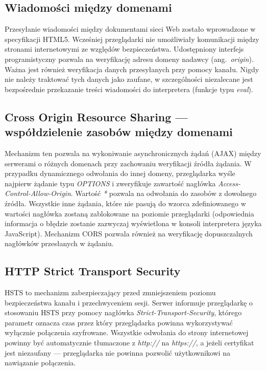 \documentclass[11pt,a4paper,polish,thesis]{dcsbook}
\begin{document}
\subsection{Wiadomości między domenami}
Przesyłanie wiadomości między dokumentami sieci Web zostało wprowadzone w specyfikacji HTML5. Wcześniej przeglądarki nie umożliwiały komunikacji między stronami internetowymi ze względów bezpieczeństwa. Udostępniony interfejs programistyczny pozwala na weryfikację adresu domeny nadawcy (ang.~\textit{origin}). Ważna jest również weryfikacja danych przesyłanych przy pomocy kanału. Nigdy nie należy traktować tych danych jako zaufane, w szczególności niezalecane jest bezpośrednie przekazanie treści wiadomości do interpretera (funkcje typu \textit{eval}).

\subsection{Cross Origin Resource Sharing --- współdzielenie zasobów między domenami}
Mechanizm ten pozwala na wykoniwanie asynchronicznych żądań (AJAX) między serwerami o różnych domenach przy zachowaniu weryfikacji źródła żądania. W przypadku dynamicznego odwołania do innej domeny, przeglądarka wyśle najpierw żądanie typu \textit{OPTIONS} i zweryfikuje zawartość nagłówka \textit{Access-Control-Allow-Origin}. Wartość \textit{*} pozwala na odwołania do zasobów z dowolnego źródła. Wszystkie inne żądania, które nie pasują do wzorca zdefiniowanego w wartości nagłówka zostaną zablokowane na poziomie przeglądarki (odpowiednia informacja o błędzie zostanie zazwyczaj wyświetlona w konsoli interpretera języka JavaScript). Mechanizm CORS pozwala również na weryfikację dopuszczalnych nagłówków przesłanych w żądaniu.

\subsection{HTTP Strict Transport Security}
HSTS to mechanizm zabezpieczający przed zmniejszeniem poziomu bezpieczeństwa kanału i przechwyceniem sesji. Serwer informuje przeglądarkę o stosowaniu HSTS przy pomocy nagłówka \textit{Strict-Transport-Security}, którego parametr oznacza czas przez który przeglądarka powinna wykorzystywać wyłącznie połączenia szyfrowane. Wszystkie odwołania do strony internetowej powinny być automatycznie tłumaczone z \textit{http://} na \textit{https://}, a jeżeli certyfikat jest niezaufany --- przeglądarka nie powinna pozwolić użytkownikowi na nawiązanie połączenia.
\end{document}
